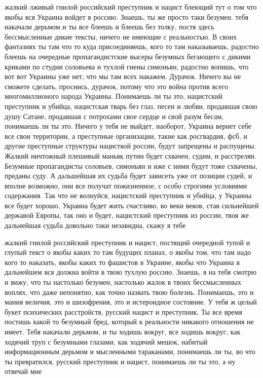 жалкий лживый гнилой российский преступник и нацист блеющий тут о том что якобы
вся Украина войдет в россию. Знаешь, ты же просто таки безумен. тебя накачали
дерьмом и ты все блеешь и блеешь без толку, постя здесь бессмысленные дикие
тексты, ничего не имеющие с реальностью.  В своих фантазиях ты там что то куда
присоединяешь, кого то там наказываешь, радостно блеешь на очередные
пропагандистские высеры безумных бегающего с дикими криками по студии соловьева
и тухлой гиены симоньян, радостно вопишь, что вот вот Украины уже нет, что мы
там всех накажем.  Дурачок. Ничего вы не сможете сделать, проснись, дурачок,
потому что это война против всего многомиллионого народа Украины. Понимаешь ли
ты это, нацистский преступник и убийца, нацистская тварь без глаз, песен и
любви, продавшая свою душу Сатане, продавшая с потрохами свое сердце и свой
разум бесам, понимаешь ли ты это.  Ничего у тебя не выйдет, наоборот, Украина
вернет себе все свои территории, а преступные организации, такие как
росгвардия, фсб, и другие преступные структуры нацисткой россии, будут
запрещены и распущены. Жалкий ничтожный плешивый маньяк путин будет схвачен,
судим, и расстрелян. Безумные пропагандисты соловьев, симоньян и иже с ними
будут тоже схвачены, преданы суду. А дальшейшая их судьба будет зависеть уже от
позиции судей, и вполне возможно, они все получат пожизненное, с особо строгими
условиями содержания. Так что не волнуйся, нацистский преступник и убийца, у
Украины все будет хорошо, Украина будет жить счастливо, во веки веков, став
сильнейшей державой Европы, так оно и будет, нацистский преступник из россии,
твоя же дальнейшая судьба довольно таки незавидна, скажу я тебе

жалкий гнилой российский преступник и нацист, постящий очередной тупой и глупый
текст о якобы каких то там будущих планах, о якобы том, что там надо кого то
наказать, якобы каких то фашистов в Украине, якобы что Украина в дальнейшем вся
должна войти в твою тухлую россию.  Знаешь, я на тебя смотрю и вижу, что ты
настолько безумен, настолько жалок в твоих бессмысленных воплях, что даже
непонятно, как точно назвать твою болезнь. Понимаешь, это и мания величия, это
и шизофрения, это и истероидное состояние. У тебя ж целый букет психических
расстройств, русский нацист и преступник. Ты все время постишь какой то
безумный бред, который к реальности никакого отношения не имеет. Тебя накачали
дерьмом, и ты ходишь вокруг, все ходишь вокруг, как ходячий труп с безумными
глазами, как ходячий мешок, набитый информационным дерьмом и мысленными
тараканами, понимаешь ли ты, во что ты превратился, русский преступник и
нацист, понимаешь ли ты это, а ну отвечай мне


